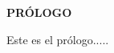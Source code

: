 \null\vspace{2.55 cm}
\begin{center}
  {\large \bfseries PRÓLOGO}
\end{center}
\vspace{1cm}
Este es el prólogo.....
